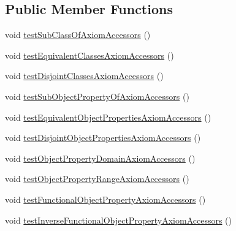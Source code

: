 \subsection*{Public Member Functions}
\begin{DoxyCompactItemize}
\item 
void \hyperlink{classorg_1_1semanticweb_1_1owlapi_1_1api_1_1test_1_1ontology_1_1_o_w_l_ontology_accessors_test_case_ae10e0555ca48f7a90605eba57462ca82}{test\-Sub\-Class\-Of\-Axiom\-Accessors} ()
\item 
void \hyperlink{classorg_1_1semanticweb_1_1owlapi_1_1api_1_1test_1_1ontology_1_1_o_w_l_ontology_accessors_test_case_ad1cf8d1b98dd3e31d891c8a779d555f7}{test\-Equivalent\-Classes\-Axiom\-Accessors} ()
\item 
void \hyperlink{classorg_1_1semanticweb_1_1owlapi_1_1api_1_1test_1_1ontology_1_1_o_w_l_ontology_accessors_test_case_a93d854fdf0c3b068fbb9c6f89d452423}{test\-Disjoint\-Classes\-Axiom\-Accessors} ()
\item 
void \hyperlink{classorg_1_1semanticweb_1_1owlapi_1_1api_1_1test_1_1ontology_1_1_o_w_l_ontology_accessors_test_case_a332352f89940397910008849d6058d00}{test\-Sub\-Object\-Property\-Of\-Axiom\-Accessors} ()
\item 
void \hyperlink{classorg_1_1semanticweb_1_1owlapi_1_1api_1_1test_1_1ontology_1_1_o_w_l_ontology_accessors_test_case_a61329f0dc965601b14d7b3024db1acb4}{test\-Equivalent\-Object\-Properties\-Axiom\-Accessors} ()
\item 
void \hyperlink{classorg_1_1semanticweb_1_1owlapi_1_1api_1_1test_1_1ontology_1_1_o_w_l_ontology_accessors_test_case_ab567a911e9ca6070cf746fa4c74015f3}{test\-Disjoint\-Object\-Properties\-Axiom\-Accessors} ()
\item 
void \hyperlink{classorg_1_1semanticweb_1_1owlapi_1_1api_1_1test_1_1ontology_1_1_o_w_l_ontology_accessors_test_case_a372b67c23bd3fb6871f5e82d4d1c68ce}{test\-Object\-Property\-Domain\-Axiom\-Accessors} ()
\item 
void \hyperlink{classorg_1_1semanticweb_1_1owlapi_1_1api_1_1test_1_1ontology_1_1_o_w_l_ontology_accessors_test_case_ac93fe80b201fcee9f83e21a9523521e3}{test\-Object\-Property\-Range\-Axiom\-Accessors} ()
\item 
void \hyperlink{classorg_1_1semanticweb_1_1owlapi_1_1api_1_1test_1_1ontology_1_1_o_w_l_ontology_accessors_test_case_a3dedac8fc0b67c59f69122f72f8108ed}{test\-Functional\-Object\-Property\-Axiom\-Accessors} ()
\item 
void \hyperlink{classorg_1_1semanticweb_1_1owlapi_1_1api_1_1test_1_1ontology_1_1_o_w_l_ontology_accessors_test_case_adbd3b9973def9fa99fc68d8b2434582d}{test\-Inverse\-Functional\-Object\-Property\-Axiom\-Accessors} ()

\end{DoxyCompactItemize}
